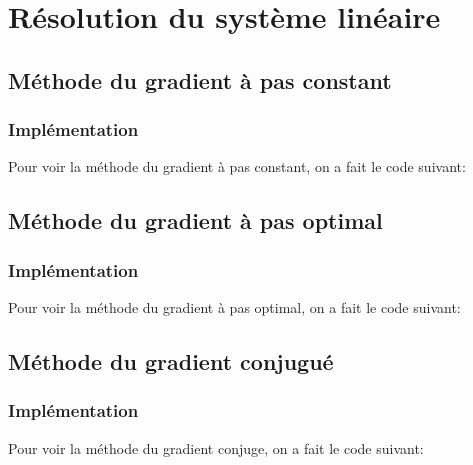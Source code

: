 \documentclass[a4paper,11pt]{article}
\begin{document}
\titleTMB 
\newpage
\tableofcontents
\listoffigures
\newpage

\section{Résolution du système linéaire}

\subsection{Méthode du gradient à pas constant}

\subsubsection{Implémentation}

Pour voir la méthode du gradient à pas constant, on a fait le code suivant:

\begin{multicols}{2}
  
\end{multicols}


\subsection{Méthode du gradient à pas optimal}

\subsubsection{Implémentation}
Pour voir la méthode du gradient à pas optimal, on a fait le code suivant:

\begin{multicols}{2}
  
\end{multicols}


\subsection{Méthode du gradient conjugué}
\subsubsection{Implémentation}

Pour voir la méthode du gradient conjuge, on a fait le code suivant:
 
\begin{multicols}{2}
  
\end{multicols}
\end{document}
